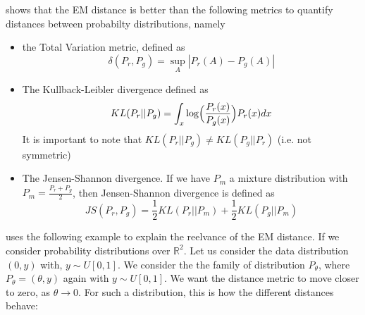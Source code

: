 \documentclass[11pt,a4paper,twoside]{report}
\begin{document}
\cite{arjovsky2017wasserstein} shows that the EM distance is better than the following metrics to quantify distances between probabilty distributions, namely

\begin{itemize}
    \item the Total Variation metric, defined as
    \begin{equation}
        \delta(P_r, P_g) = \sup_{A} |P_r(A) -  P_g(A)|
    \end{equation}
    \item The Kullback-Leibler divergence defined as
    \begin{equation}
        KL(P_r||P_g) = \int_x  \log \Bigl( \frac{P_r(x)}{P_g(x)} \Bigr) P_r(x) dx
    \end{equation}
    It is important to note that $KL(P_r||P_g) \neq KL(P_g||P_r)$ (i.e. not symmetric)
    \item The Jensen-Shannon divergence. If we have $P_m$ a mixture distribution with $P_m = \frac{P_r + P_g}{2}$, then Jensen-Shannon divergence is defined as  
    \begin{equation}
        JS(P_r, P_g) = \frac{1}{2} KL(P_r||P_m) + \frac{1}{2} KL(P_g||P_m)
    \end{equation}
\end{itemize}

\cite{arjovsky2017wasserstein} uses the following example to explain the reelvance of the EM distance. If we consider probability distributions over $\mathbb{R}^2$. Let us consider the data distribution $(0, y)$ with, $y \sim U[0,1]$. We consider the the family of distribution $P_{\theta}$, where $P_{\theta} = (\theta, y)$ again with $y \sim U[0,1]$. We want the distance metric to move closer to zero, as $\theta \rightarrow 0$. For such a distribution, this is how the different distances behave:
\end{document}
